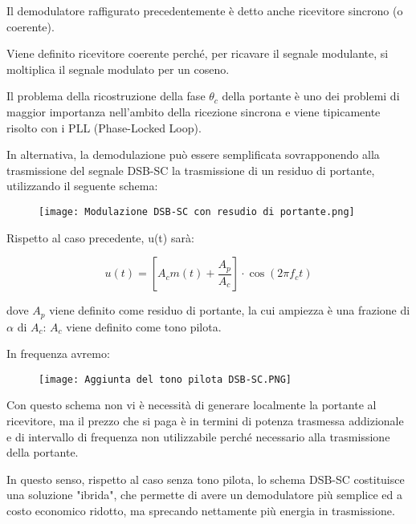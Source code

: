 Il demodulatore raffigurato precedentemente è detto anche ricevitore sincrono (o coerente). \newline 

Viene definito ricevitore coerente perché, per ricavare il segnale modulante, 
si moltiplica il segnale modulato per un coseno. \newline  

Il problema della ricostruzione della fase $\theta_c$ della portante è uno dei problemi di maggior importanza nell'ambito della ricezione sincrona e viene tipicamente risolto con i PLL (Phase-Locked Loop). \newline 

In alternativa, la demodulazione può essere semplificata sovrapponendo alla trasmissione del segnale DSB-SC la trasmissione di un residuo di portante, 
utilizzando il seguente schema: 

\begin{figure}[h]
    \centering
    \texttt{[image: Modulazione DSB-SC con resudio di portante.png]}
\end{figure} 

Rispetto al caso precedente, u(t) sarà: 

{
    \Large 
    \begin{equation}
        u (t)
        = 
        \left[A_c m(t) + \frac{A_p}{A_c} \right] \cdot \cos(2 \pi f_c t)
    \end{equation}
}

dove $A_p$ viene definito come residuo di portante, la cui ampiezza è una frazione di $\alpha$ di $A_c$: 
$A_c$ viene definito come tono pilota. \newline 

\newpage 

In frequenza avremo: 

\begin{figure}[h]
    \centering
    \texttt{[image: Aggiunta del tono pilota DSB-SC.PNG]}
\end{figure} 

Con questo schema non vi è necessità di generare localmente la portante al ricevitore, 
ma il prezzo che si paga è in termini di potenza trasmessa addizionale e di intervallo di frequenza non utilizzabile 
perché necessario alla trasmissione della portante. \newline 

In questo senso, rispetto al caso senza tono pilota, lo schema DSB-SC costituisce una soluzione "ibrida", 
che permette di avere un demodulatore più semplice ed a costo economico ridotto, ma sprecando nettamente più energia in trasmissione. \newline 

